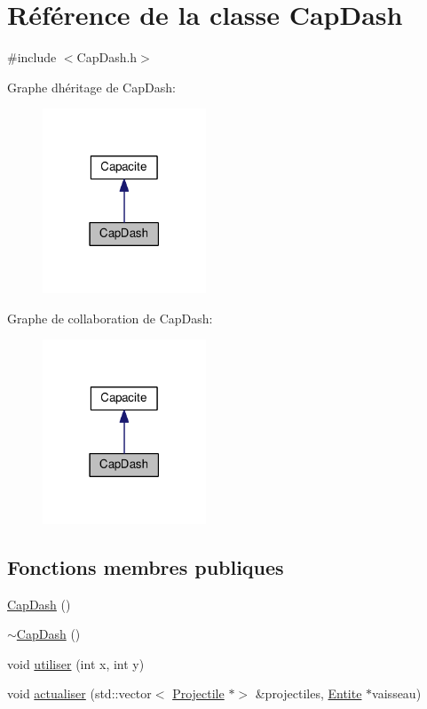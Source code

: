\hypertarget{class_cap_dash}{}\section{Référence de la classe Cap\+Dash}
\label{class_cap_dash}


{\ttfamily \#include $<$Cap\+Dash.\+h$>$}



Graphe d\textquotesingle{}héritage de Cap\+Dash\+:
\nopagebreak
\begin{figure}[H]
\begin{center}
\leavevmode
\includegraphics[width=138pt]{class_cap_dash__inherit__graph}
\end{center}
\end{figure}


Graphe de collaboration de Cap\+Dash\+:
\nopagebreak
\begin{figure}[H]
\begin{center}
\leavevmode
\includegraphics[width=138pt]{class_cap_dash__coll__graph}
\end{center}
\end{figure}
\subsection*{Fonctions membres publiques}
\begin{DoxyCompactItemize}
\item 
\hyperlink{class_cap_dash_ac38287e31284b6b5ac8add730830bfed}{Cap\+Dash} ()
\item 
\hyperlink{class_cap_dash_aa935262b9ebdaf197294aba7211663cc}{$\sim$\+Cap\+Dash} ()
\item 
void \hyperlink{class_cap_dash_ada59ecb62d2c18f6bb6b4acf28a2da93}{utiliser} (int x, int y)
\item 
void \hyperlink{class_cap_dash_a886522c648db49b81c330737ad96a517}{actualiser} (std\+::vector$<$ \hyperlink{class_projectile}{Projectile} $\ast$$>$ \&projectiles, \hyperlink{class_entite}{Entite} $\ast$vaisseau)
\end{DoxyCompactItemize}
